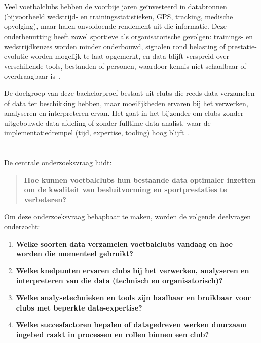 \section{}%
\label{sec:probleemstelling}

Veel voetbalclubs hebben de voorbije jaren geïnvesteerd in databronnen (bijvoorbeeld wedstrijd- en trainingsstatistieken, GPS, tracking, medische opvolging), maar halen onvoldoende rendement uit die informatie.
Deze onderbenutting heeft zowel sportieve als organisatorische gevolgen: trainings- en wedstrijdkeuzes worden minder onderbouwd, signalen rond belasting of prestatie-evolutie worden mogelijk te laat opgemerkt, en data blijft verspreid over verschillende tools, bestanden of personen, waardoor kennis niet schaalbaar of overdraagbaar is~\autocite{Rein2016}.

De doelgroep van deze bachelorproef bestaat uit clubs die reeds data verzamelen of data ter beschikking hebben, maar moeilijkheden ervaren bij het verwerken, analyseren en interpreteren ervan.
Het gaat in het bijzonder om clubs zonder uitgebouwde data-afdeling of zonder fulltime data-analist, waar de implementatiedrempel (tijd, expertise, tooling) hoog blijft~\autocite{Alamar2013}.

\section{}%
\label{sec:onderzoeksvraag}

De centrale onderzoeksvraag luidt:

\begin{quote}
  \textbf{Hoe kunnen voetbalclubs hun bestaande data optimaler inzetten om de kwaliteit van besluitvorming en sportprestaties te verbeteren?}
\end{quote}

Om deze onderzoeksvraag behapbaar te maken, worden de volgende deelvragen onderzocht:

\begin{enumerate}
  \item \textbf{Welke soorten data verzamelen voetbalclubs vandaag en hoe worden die momenteel gebruikt?}
  \item \textbf{Welke knelpunten ervaren clubs bij het verwerken, analyseren en interpreteren van die data (technisch en organisatorisch)?}
  \item \textbf{Welke analysetechnieken en tools zijn haalbaar en bruikbaar voor clubs met beperkte data-expertise?}
  \item \textbf{Welke succesfactoren bepalen of datagedreven werken duurzaam ingebed raakt in processen en rollen binnen een club?}
\end{enumerate}

